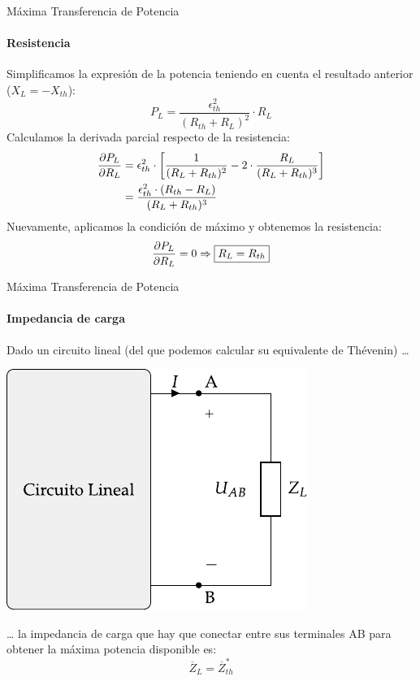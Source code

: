 \documentclass[aspectratio=169, usenames,svgnames,dvipsnames]{beamer}
\begin{document}
\begin{frame}[label={sec:org92a90c8}]{Máxima Transferencia de Potencia}
\framesubtitle{Resistencia}
Simplificamos la expresión de la potencia teniendo en cuenta el resultado anterior (\(X_L = - X_{th}\)):
\[
  P_L = \frac{\epsilon^2_{th}}{(R_{th} + R_L)^2} \cdot R_L
\]
Calculamos la derivada parcial respecto de la resistencia:
\begin{align*}
  \diffp{P_L}{R_L} &= \epsilon^2_{th} \cdot \left[\frac{1}{(R_L + R_{th})^2} - 2 \cdot \frac{R_L}{(R_L + R_{th})^3}\right]\\
		   &= \frac{\epsilon^2_{th} \cdot (R_{th} - R_L)}{(R_L + R_{th})^3}
\end{align*}
Nuevamente, aplicamos la condición de máximo y obtenemos la resistencia:
\[
   \diffp{P_L}{R_L} = 0 \Rightarrow \boxed{R_L = R_{th}}
\]
\end{frame}

\begin{frame}[label={sec:orgee2c28f}]{Máxima Transferencia de Potencia}
\framesubtitle{Impedancia de carga}

Dado un circuito lineal (del que podemos calcular su equivalente de Thévenin) \ldots{}
\begin{center}
\includegraphics[height=0.45\textheight]{../figs/EquivalenteThevenin.pdf}
\end{center}

\ldots{} la impedancia de carga que hay que conectar entre sus terminales AB para obtener la máxima potencia disponible es:
\[
  \boxed{\overline{Z}_L = \overline{Z}_{th}^*}
\]
\end{frame}
\end{document}
